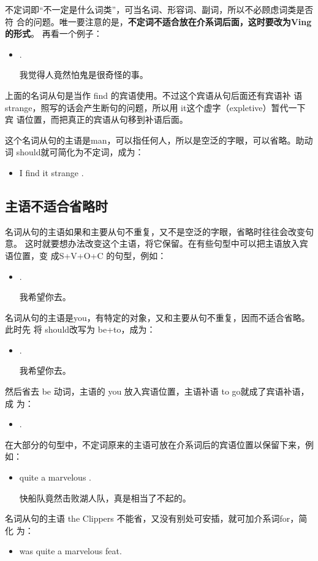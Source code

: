 不定词即“不一定是什么词类”，可当名词、形容词、副词，所以不必顾虑词类是否符
合的问题。唯一要注意的是，\textbf{不定词不适合放在介系词后面，这时要改为Ving 的形式}。
再看一个例子：
\begin{itemize}
\item {}    .

  我觉得人竟然怕鬼是很奇怪的事。
\end{itemize}
上面的名词从句是当作 find 的宾语使用。不过这个宾语从句后面还有宾语补
语strange，照写的话会产生断句的问题，所以用 it这个虚字（expletive）暂代一下宾
语位置，而把真正的宾语从句移到补语后面。

这个名词从句的主语是man，可以指任何人，所以是空泛的字眼，可以省略。助动
词 should就可简化为不定词，成为：
\begin{itemize}
\item I find it strange .
\end{itemize}

\subsection{主语不适合省略时}

名词从句的主语如果和主要从句不重复，又不是空泛的字眼，省略时往往会改变句意。
这时就要想办法改变这个主语，将它保留。在有些句型中可以把主语放入宾语位置，变
成S+V+O+C 的句型，例如：
\begin{itemize}
\item {}  .

  我希望你去。
\end{itemize}
名词从句的主语是you，有特定的对象，又和主要从句不重复，因而不适合省略。此时先
将 should改写为 be+to，成为：
\begin{itemize}
\item {}  .

  我希望你去。
\end{itemize}
然后省去 be 动词，主语的 you 放入宾语位置，主语补语 to go就成了宾语补语，成
为：
\begin{itemize}
\item {}   .
\end{itemize}

在大部分的句型中，不定词原来的主语可放在介系词后的宾语位置以保留下来，例如：
\begin{itemize}
\item {}  quite a marvelous .

  快船队竟然击败湖人队，真是相当了不起的。
\end{itemize}
名词从句的主语 the Clippers 不能省，又没有别处可安插，就可加介系词for，简化
为：
\begin{itemize}
\item {} was quite a marvelous feat.
\end{itemize}

